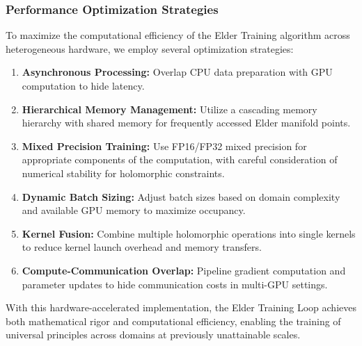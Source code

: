 \subsubsection{Performance Optimization Strategies}

To maximize the computational efficiency of the Elder Training algorithm across heterogeneous hardware, we employ several optimization strategies:

\begin{enumerate}
    \item \textbf{Asynchronous Processing:} Overlap CPU data preparation with GPU computation to hide latency.
    
    \item \textbf{Hierarchical Memory Management:} Utilize a cascading memory hierarchy with shared memory for frequently accessed Elder manifold points.
    
    \item \textbf{Mixed Precision Training:} Use FP16/FP32 mixed precision for appropriate components of the computation, with careful consideration of numerical stability for holomorphic constraints.
    
    \item \textbf{Dynamic Batch Sizing:} Adjust batch sizes based on domain complexity and available GPU memory to maximize occupancy.
    
    \item \textbf{Kernel Fusion:} Combine multiple holomorphic operations into single kernels to reduce kernel launch overhead and memory transfers.
    
    \item \textbf{Compute-Communication Overlap:} Pipeline gradient computation and parameter updates to hide communication costs in multi-GPU settings.
\end{enumerate}

With this hardware-accelerated implementation, the Elder Training Loop achieves both mathematical rigor and computational efficiency, enabling the training of universal principles across domains at previously unattainable scales.